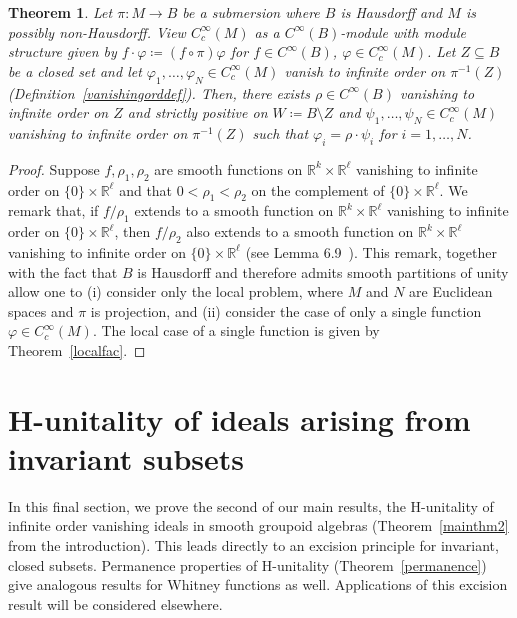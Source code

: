\documentclass[12pt]{article}
\theoremstyle{plain}
\newtheorem{thm}{Theorem}[section]
\theoremstyle{definition}
\newcommand{\R}{\mathbb{R}}
\numberwithin{equation}{section}
\begin{document}
 

\begin{thm}\label{subfac}
Let $\pi : M \to B$ be a submersion where $B$ is Hausdorff and $M$ is possibly non-Hausdorff. View $C_c^\infty(M)$ as a $C^\infty(B)$-module with module structure given by $f \cdot \varphi \coloneqq (f \circ \pi)\varphi$ for $f \in C^\infty(B)$, $\varphi \in C_c^\infty(M)$. Let $Z \subseteq B$ be a closed set and let $\varphi_1,\ldots, \varphi_N \in C_c^\infty(M)$ vanish to infinite order on $\pi^{-1}(Z)$ (Definition~\ref{vanishingorddef}). Then, there exists $\rho \in C^\infty(B)$ vanishing to infinite order on $Z$ and strictly positive on $W\coloneqq B \setminus Z$ and $\psi_1,\ldots,\psi_N \in C_c^\infty(M)$ vanishing to infinite order on $\pi^{-1}(Z)$ such that $\varphi_i=\rho \cdot \psi_i$ for $i=1,\ldots,N$. 
\end{thm}


\begin{proof}
Suppose  $f,\rho_1,\rho_2$  are smooth functions on $\R^k \times \R^\ell$ vanishing to infinite order on $\{0\} \times \R^\ell$ and that $0 < \rho_1 < \rho_2$  on the complement of $\{0\} \times \R^\ell$. We remark that, if $f/\rho_1$ extends to a smooth function on $\R^k \times \R^\ell$ vanishing to infinite order on $\{0\} \times \R^\ell$, then $f/\rho_2$ also extends to a smooth function on $\R^k \times \R^\ell$ vanishing to infinite order on $\{0\} \times \R^\ell$ (see Lemma 6.9~\cite{Francis[DM]}). This remark, together with the fact that $B$ is Hausdorff and therefore  admits smooth partitions of unity allow one to (i) consider only the local problem, where $M$ and $N$ are Euclidean spaces and $\pi$ is projection, and (ii) consider the case of only a single function $\varphi \in C_c^\infty(M)$. The local case of a single function is given by Theorem~\ref{localfac}.
\end{proof}






\section{H-unitality of ideals arising from  invariant subsets}

In this final section, we prove the second of our main results, the H-unitality of infinite order vanishing ideals in smooth groupoid algebras (Theorem~\ref{mainthm2} from the introduction).  This leads directly to an excision principle for invariant, closed subsets.  Permanence properties of H-unitality (Theorem~\ref{permanence}) give analogous results for Whitney functions as well. Applications of this excision result will be considered elsewhere. 
\end{document}
